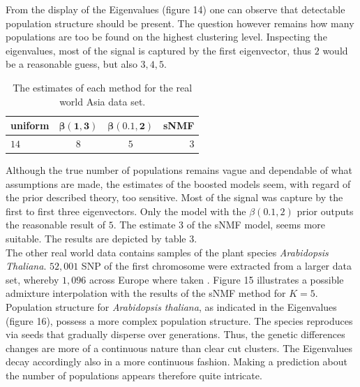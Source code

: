\documentclass[a4paper, 11pt]{article}
\begin{document}
From the display of the Eigenvalues (figure 14) one can observe that detectable population structure should be present. The question however remains how many populations are too be found on the highest clustering level. Inspecting the eigenvalues, most of the signal is captured by the first eigenvector, thus $2$ would be a reasonable guess, but also $3, 4, 5$.

\begin{table}[h!]
  \begin{center}
    \label{tab:table2}
    \begin{tabular}{l|c|c|r} %
      \textbf{uniform} & $\mathbf{\beta(1, 3)}$ & $\mathbf{\beta(0.1,2)}$  & \textbf{sNMF}\\
      \hline
      $14$ & $8$ & $5$  & $3$\\
    \end{tabular}
    \caption{The estimates of each method for the real world Asia data set.}
  \end{center}
\end{table}

Although the true number of populations remains vague and dependable of what assumptions are made, the estimates of the boosted models seem, with regard of the prior described theory, too sensitive. Most of the signal was capture by the first to first three eigenvectors. Only the model with the $\beta(0.1, 2)$ prior outputs the reasonable result of $5$. The estimate $3$ of the sNMF model, seems more suitable. The results are depicted by table 3.\\

The other real world data contains samples of the plant species \textit{Arabidopsis Thaliana}. $52,001$ SNP of the first chromosome were extracted from a larger data set, whereby $1,096$ across Europe where taken \parencite{franccois2016running}.
Figure 15 illustrates a possible admixture interpolation with the results of the sNMF method for $K = 5$. Population structure for \textit{Arabidopsis thaliana}, as indicated in the Eigenvalues (figure 16), possess a more complex population structure. The species reproduces via seeds that gradually disperse over generations. Thus, the genetic differences changes are more of a continuous nature than clear cut clusters. The Eigenvalues decay accordingly also in a more continuous fashion. Making a prediction about the number of populations appears therefore quite intricate.
\end{document}
